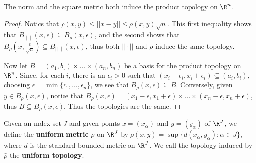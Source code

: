 \begin{theorem}\label{2.2.7}
    The norm and the square metric both induce the product topology on $\R^n$.
\end{theorem}
\begin{proof}
    Notics that $\rho(x,y) \leq ||x-y|| \leq \rho(x,y)\sqrt{n}$. This first
    inequality shows that
    $B_{||\cdot||}(x,\epsilon) \subseteq B_{\rho}(x,\epsilon)$, and the second shows that
    $B_{\rho}(x,\frac{\epsilon}{\sqrt{n}}) \subseteq B_{||\cdot||}(x,\epsilon)$, thus both
    $||\cdot||$ and  $\rho$ induce the same topology.

    Now let  $B=(a_1,b_1) \times \dots \times (a_n,b_n)$ be a basis for the product topology on $
    \R^n$. Since, for each  $i$, there is an  $\epsilon_i>0$ such that
    $(x_i-\epsilon_i,x_i+\epsilon_i) \subseteq (a_i,b_i)$, choosing $\epsilon=\min\{\epsilon_1,
    \dots, \epsilon_n\}$, we see that $B_{\rho}(x,\epsilon) \subseteq B$. Conversely, given $y \in
    B_{\rho}(x,\epsilon)$, notice that $B_{\rho}(x, \epsilon)=(x_1-\epsilon,x_1+\epsilon) \times
    \dots \times (x_n-\epsilon,x_n+\epsilon)$, thus $B \subseteq B_{\rho}(x,\epsilon)$. Thus the
    topologies are the same.
\end{proof}

\begin{definition}
    Given an index set $J$ and given points  $x=(x_{\alpha})$ and
    $y=(y_{\alpha})$ of $\R^J$, we define the \textbf {uniform metric}
    $\bar{\rho}$ on $\R^J$ by $\bar{\rho}(x,y)=\sup\{\bar{d}(x_{\alpha},
    y_{\alpha}): \alpha \in J\}$, where $\bar{d}$ is the standard bounded
    metric on  $\R^J$. We call the topology induced by $\bar{\rho}$ the
    \textbf{uniform topology}.
\end{definition}

